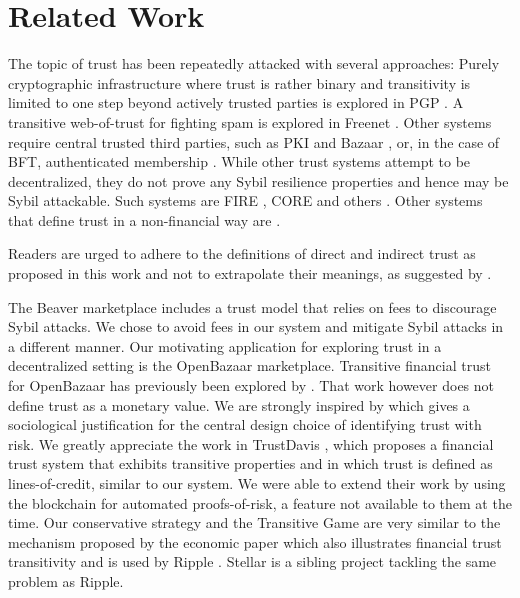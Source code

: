 \section{Related Work}
  The topic of trust has been repeatedly attacked with several approaches: Purely cryptographic infrastructure where trust
  is rather binary and transitivity is limited to one step beyond actively trusted parties is explored in PGP \cite{pgp}. A
  transitive web-of-trust for fighting spam is explored in Freenet \cite{freenet}. Other systems require central trusted
  third parties, such as PKI \cite{pki} and Bazaar \cite{bazaar}, or, in the case of BFT, authenticated membership
  \cite{byzantine}. While other trust systems attempt to be decentralized, they do not prove any Sybil resilience properties
  and hence may be Sybil attackable. Such systems are FIRE \cite{fire}, CORE \cite{core} and others \cite{openrep,ghkkw,rk}.
  Other systems that define trust in a non-financial way are \cite{mui,beta,pace,vpc,sdt,wot,pathfinder}.

  Readers are urged to adhere to the definitions of direct and indirect trust as proposed in this work and not to extrapolate
  their meanings, as suggested by \cite{badtrust}.

  The Beaver marketplace \cite{beaver} includes a trust model that relies on
  fees to discourage Sybil attacks. We chose to avoid fees in our system and mitigate Sybil attacks in a different manner.
  Our motivating application for exploring trust in a decentralized setting is the OpenBazaar marketplace. Transitive
  financial trust for OpenBazaar has previously been explored by \cite{dionyziz}. That work however does not define trust
  as a monetary value. We are strongly inspired by \cite{kmrs}
  which gives a sociological justification for the central design choice of identifying trust with
  risk. We greatly appreciate the work in TrustDavis \cite{davis}, which proposes a financial trust system that exhibits
  transitive properties and in which trust is defined as lines-of-credit, similar to our system. We were able to extend
  their work by using the blockchain for automated proofs-of-risk, a feature not available to them at the time. Our
  conservative strategy and the Transitive Game are very similar to the mechanism proposed by the economic paper
  \cite{iou} which also illustrates financial trust transitivity and is used by Ripple \cite{ripple}. Stellar \cite{stellar}
  is a sibling project tackling the same problem as Ripple.

